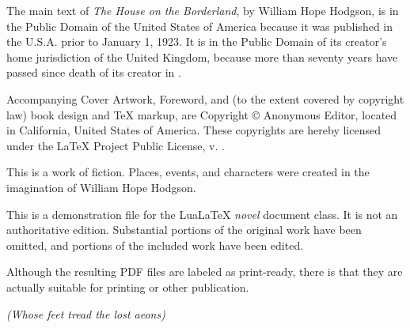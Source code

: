 \documentclass{novel} %
\begin{document}
\thispagestyle{empty}
\null
\vfill
\begin{legalese}
The main text of \textit{The House on the Borderland}, by William Hope Hodgson, is in the Public Domain of the United States of America because it was published in the U.S.A. prior to January 1, 1923. It is in the Public Domain of its creator’s home jurisdiction of the United Kingdom, because more than seventy years have passed since death of its creator in .\par
\null
Accompanying Cover Artwork, Foreword, and (to the extent covered by copyright law) book design and TeX markup, are Copyright © Anonymous Editor, located in California, United States of America. These copyrights are hereby licensed under the LaTeX Project Public License, v. .\par
\null
This is a work of fiction. Places, events, and characters were created in the imagination of William Hope Hodgson.\par
\null
{} This is a demonstration file for the LuaLaTeX \textit{novel} document class. It is not an authoritative edition. Substantial portions of the original work have been omitted, and portions of the included work have been edited.\par
\null
{} Although the resulting PDF files are labeled as print-ready, there is  that they are actually suitable for printing or other publication.\par
\end{legalese}
\clearpage


\thispagestyle{empty}
\vspace*{6\nbs}
{\centering{}\par}
\vspace{0.5\nbs}
{\centering\textit{(Whose feet tread the lost aeons)}\par}
\clearpage %
\end{document}
